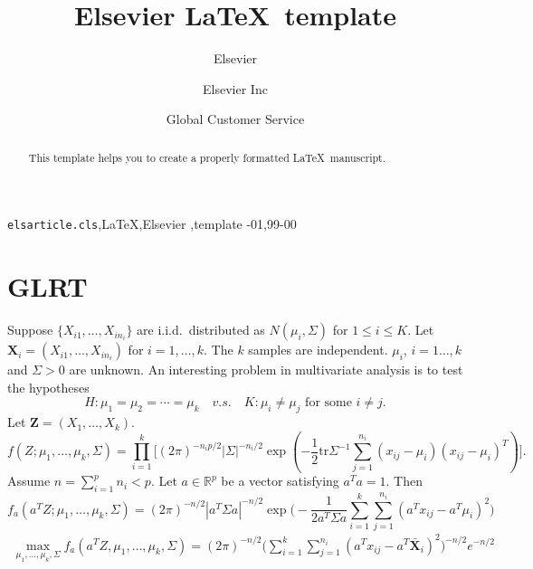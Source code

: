 \documentclass[review]{elsarticle}
\theoremstyle{plain}
\theoremstyle{definition}
\theoremstyle{remark}
\begin{document}
\begin{frontmatter}

\title{Elsevier \LaTeX\ template}

\author{Elsevier}
\address{Radarweg 29, Amsterdam}

\author[mymainaddress,mysecondaryaddress]{Elsevier Inc}

\author[mysecondaryaddress]{Global Customer Service}

\address[mymainaddress]{1600 John F Kennedy Boulevard, Philadelphia}
\address[mysecondaryaddress]{360 Park Avenue South, New York}

\begin{abstract}
This template helps you to create a properly formatted \LaTeX\ manuscript.
\end{abstract}

\begin{keyword}
\texttt{elsarticle.cls}\sep \LaTeX\sep Elsevier \sep template
-01\sep  99-00
\end{keyword}

\end{frontmatter}

\linenumbers
\section{GLRT}
Suppose $\{X_{i1},\ldots, X_{in_i}\}$ are i.i.d.\ distributed as $N(\mu_i,\Sigma)$ for $1\leq i\leq K$.
Let $\mathbf{X}_i=(X_{i1},\ldots,X_{in_i})$ for $i=1,\ldots,k$.
The $k$ samples are independent.
$\mu_i$, $i=1\ldots, k$ and $\Sigma>0$ are unknown. An interesting problem in multivariate analysis is to test the hypotheses
\begin{equation}
    H: \mu_1=\mu_2=\cdots=\mu_k\quad v.s.\quad K: \textrm{$\mu_i\neq \mu_j$ for some $i\neq j$}.
\end{equation}
Let $\mathbf{Z}=(X_1,\ldots,X_k)$.
$$
f(Z;\mu_1,\ldots,\mu_k,\Sigma)=\prod_{i=1}^k\Big[
    (2\pi)^{-n_i p/2}|\Sigma|^{-n_i/2}\exp(-\frac{1}{2}\mathrm{tr}\Sigma^{-1}\sum_{j=1}^{n_i}(x_{ij}-\mu_i)(x_{ij}-\mu_i)^T)
    \Big].
$$
Assume $n=\sum_{i=1}^p n_i<p$. Let $a\in \mathbb{R}^p$ be a vector satisfying $a^T a=1$. Then
$$
f_a(a^T Z;\mu_1,\ldots,\mu_k,\Sigma)=
    (2\pi)^{-n/2}|a^T \Sigma a|^{-n/2}\exp\Big(-\frac{1}{2 a^T \Sigma a}\sum_{i=1}^k\sum_{j=1}^{n_i}(a^Tx_{ij}-a^T\mu_i)^2\Big)
$$
\begin{equation}
    \begin{aligned}
        \max_{\mu_1,\ldots,\mu_k,\Sigma}f_a(a^T Z,\mu_1,\ldots,\mu_k,\Sigma)
        =
        (2\pi)^{-n/2}\big(\sum_{i=1}^k\sum_{j=1}^{n_i}(a^Tx_{ij}-a^T\bar{\mathbf{X}}_i)^2\big)^{-n/2}e^{-{n}/{2}}
    \end{aligned}
\end{equation}
\end{document}
